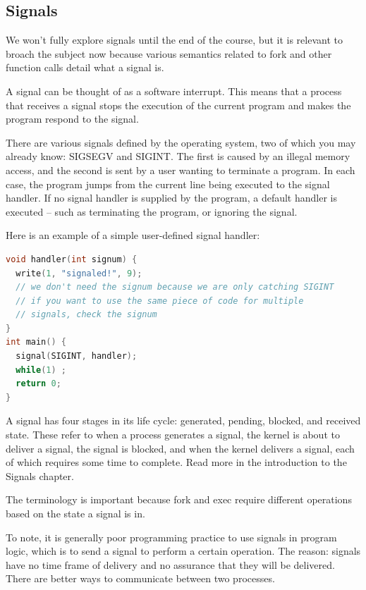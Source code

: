 \subsection{Signals}

We won't fully explore signals until the end of the course, but it is relevant to broach the subject now because various semantics related to fork and other function calls detail what a signal is.

A signal can be thought of as a software interrupt. This means that a process that receives a signal stops the execution of the current program and makes the program respond to the signal.

There are various signals defined by the operating system, two of which you may already know: SIGSEGV and SIGINT.
The first is caused by an illegal memory access, and the second is sent by a user wanting to terminate a program.
In each case, the program jumps from the current line being executed to the signal handler.
If no signal handler is supplied by the program, a default handler is executed -- such as terminating the program, or ignoring the signal.

Here is an example of a simple user-defined signal handler:

\begin{lstlisting}[language=C]
void handler(int signum) {
  write(1, "signaled!", 9);
  // we don't need the signum because we are only catching SIGINT
  // if you want to use the same piece of code for multiple
  // signals, check the signum
}
int main() {
  signal(SIGINT, handler);
  while(1) ;
  return 0;
}
\end{lstlisting}

A signal has four stages in its life cycle: generated, pending, blocked, and received state.
These refer to when a process generates a signal, the kernel is about to deliver a signal, the signal is blocked, and when the kernel delivers a signal, each of which requires some time to complete.
Read more in the introduction to the Signals chapter.

The terminology is important because fork and exec require different operations based on the state a signal is in.

To note, it is generally poor programming practice to use signals in program logic, which is to send a signal to perform a certain operation.
The reason: signals have no time frame of delivery and no assurance that they will be delivered.
There are better ways to communicate between two processes.

